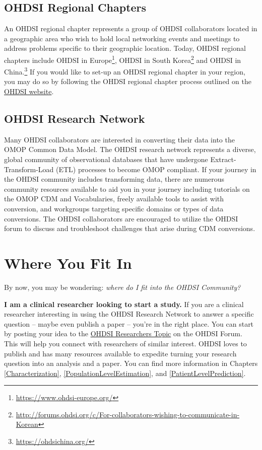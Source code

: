\documentclass[11pt]{book}
\let\rmarkdownfootnote\footnote%
\def\footnote{\protect\rmarkdownfootnote}
\theoremstyle{definition}
\theoremstyle{definition}
\theoremstyle{definition}
\theoremstyle{remark}
\begin{document}
\subsection{OHDSI Regional Chapters}\label{ohdsi-regional-chapters}

An OHDSI regional chapter represents a group of OHDSI collaborators
located in a geographic area who wish to hold local networking events
and meetings to address problems specific to their geographic location.
Today, OHDSI regional chapters include OHDSI in Europe\footnote{\url{https://www.ohdsi-europe.org/}},
OHDSI in South Korea\footnote{\url{http://forums.ohdsi.org/c/For-collaborators-wishing-to-communicate-in-Korean}}
and OHDSI in China.\footnote{\url{https://ohdsichina.org/}} If you would
like to set-up an OHDSI regional chapter in your region, you may do so
by following the OHDSI regional chapter process outlined on the
\href{https://www.ohdsi.org/who-we-are/regional-chapters}{OHDSI
website}. 

\subsection{OHDSI Research Network}\label{ohdsi-research-network}

Many OHDSI collaborators are interested in converting their data into
the OMOP Common Data Model. The OHDSI research network represents a
diverse, global community of observational databases that have undergone
Extract-Transform-Load (ETL) processes to become OMOP compliant. If your
journey in the OHDSI community includes transforming data, there are
numerous community resources available to aid you in your journey
including tutorials on the OMOP CDM and Vocabularies, freely available
tools to assist with conversion, and workgroups targeting specific
domains or types of data conversions. The OHDSI collaborators are
encouraged to utilize the OHDSI forum to discuss and troubleshoot
challenges that arise during CDM conversions.

\section{Where You Fit In}\label{where-you-fit-in}

By now, you may be wondering: \emph{where do I fit into the OHDSI
Community?}

\textbf{I am a clinical researcher looking to start a study.} If you are
a clinical researcher interesting in using the OHDSI Research Network to
answer a specific question -- maybe even publish a paper -- you're in
the right place. You can start by posting your idea to the
\href{https://forums.ohdsi.org/c/researchers}{OHDSI Researchers Topic}
on the OHDSI Forum. This will help you connect with researchers of
similar interest. OHDSI loves to publish and has many resources
available to expedite turning your research question into an analysis
and a paper. You can find more information in Chapters
\ref{Characterization}, \ref{PopulationLevelEstimation}, and
\ref{PatientLevelPrediction}.
\end{document}

